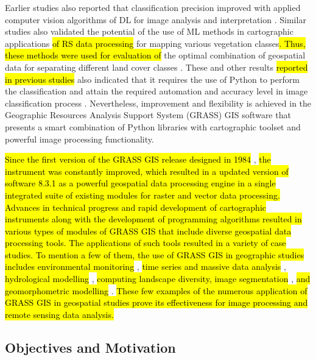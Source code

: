 \documentclass[coasts,article,submit,pdftex,moreauthors]{Definitions/mdpi}
\begin{document}
Earlier studies also reported that classification precision improved with applied computer vision algorithms of DL for image analysis and interpretation \cite{GUO20231,rs15215121,DOU2021102477}. Similar studies also validated the potential of the use of ML methods in cartographic\hl{ }applications \hl{of RS data processing }for mapping various vegetation classes\hl{. Thus, these methods were used for evaluation of }the optimal combination of geospatial data for separating different land cover classes \cite{BOULILA2021106014,LIN2024102618}. These and other\hl{ }results \hl{reported in previous studies }also indicated that it requires the use of Python to perform the classification and attain the required automation and accuracy level in image classification process \cite{ROBERTS2022105192,GUO2023e21542,Redoloza}. Nevertheless, improvement and flexibility is achieved in the Geographic Resources Analysis Support System (GRASS) GIS software that presents a smart combination of Python libraries with cartographic toolset and powerful image processing functionality. 

\hl{Since the first version of the GRASS GIS release designed in 1984} \cite{GRASS_GIS_software}, \hl{the instrument was constantly improved, which resulted in a updated version of software 8.3.1 as a powerful geospatial data processing engine in a single integrated suite of existing modules for raster and vector data processing. Advances in technical progress and rapid development of cartographic instruments along with the development of programming algorithms resulted in various types of modules of GRASS GIS that include diverse geospatial data processing tools. The applications of such tools resulted in a variety of case studies. To mention a few of them, the use of GRASS GIS in geographic studies includes environmental monitoring} \cite{STRIGARO201668,Lemenkova202322}, \hl{time series and massive data analysis} \cite{JASIEWICZ20111525,Lemenkova202313}, \hl{hydrological modelling} \cite{JASIEWICZ20111162}, \hl{computing landscape diversity, image segmentation} \cite{Lemenkova202320,ROCCHINI201382}, \hl{and geomorphometric modelling} \cite{HOFIERKA2009387}. \hl{These few examples of the numerous application of GRASS GIS in geospatial studies prove its effectiveness for image processing and remote sensing data analysis.}

\subsection{Objectives and Motivation}
\end{document}
